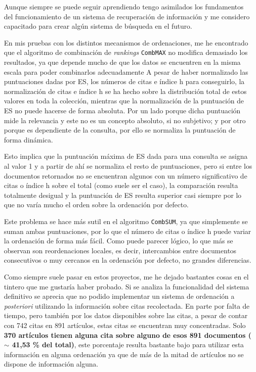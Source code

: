 Aunque siempre se puede seguir aprendiendo tengo asimilados los fundamentos del funcionamiento de un sistema de recuperación de información y me considero capacitado para crear algún sistema de búsqueda en el futuro.

En mis pruebas con los distintos mecanismos de ordenaciones, me he encontrado que el algoritmo de combinación de \textit{rankings} \texttt{CombMAX} no modifica demasiado los resultados, ya que depende mucho de que los datos se encuentren en la misma escala para poder combinarlos adecuadamente A pesar de haber normalizado las puntuaciones dadas por \acrshort{ES}, los números de citas e índice h para conseguirlo, la normalización de citas e índice h se ha hecho sobre la distribución total de estos valores en toda la colección, mientras que la normalización de la puntuación de \acrshort{ES} no puede hacerse de forma absoluta. Por un lado porque dicha puntuación mide la relevancia y este no es un concepto absoluto, si no subjetivo; y por otro porque es dependiente de la consulta, por ello se normaliza la puntuación de forma dinámica.

Esto implica que la puntuación máxima de \acrshort{ES} dada para una consulta se asigna al valor 1 y a partir de ahí se normaliza el resto de puntuaciones, pero si entre los documentos retornados no se encuentran algunos con un número significativo de citas o índice h sobre el total (como suele ser el caso), la comparación resulta totalmente desigual y la puntuación de \acrshort{ES} resulta superior casi siempre por lo que no varía mucho el orden sobre la ordenación por defecto.

Este problema se hace más sutil en el algoritmo \texttt{CombSUM}, ya que simplemente se suman ambas puntuaciones, por lo que el número de citas o índice h puede variar la ordenación de forma más fácil. Como puede parecer lógico, lo que más se observan son reordenaciones locales, es decir, intercambios entre documentos consecutivos o muy cercanos en la ordenación por defecto, no grandes diferencias.

Como siempre suele pasar en estos proyectos, me he dejado bastantes cosas en el tintero que me gustaría haber probado. Si se analiza la funcionalidad del sistema definitivo se aprecia que no podido implementar un sistema de ordenación a \textit{posteriori} utilizando la información sobre citas recolectada. En parte por falta de tiempo, pero también por los datos disponibles sobre las citas, a pesar de contar con 742 citas en 891 artículos, estas citas se encuentran muy concentradas. Solo \textbf{370 artículos tienen alguna cita sobre alguno de esos 891 documentos ($\sim$ 41,53 \% del total)}, este porcentaje resulta bastante bajo para utilizar esta información en alguna ordenación ya que de más de la mitad de artículos no se dispone de información alguna.


